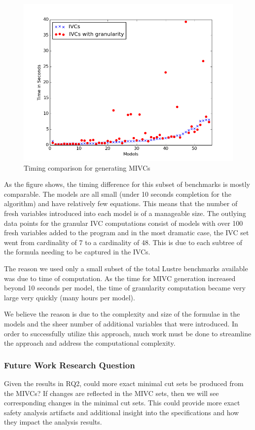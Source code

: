 \begin{figure}[h!]
\begin{center}
\includegraphics[width=.8\textwidth]{images/granularityIVC.png}
\caption{Timing comparison for generating MIVCs} 
\label{fig:granIVC}
\end{center}
\end{figure}

As the figure shows, the timing difference for this subset of benchmarks is mostly comparable. The models are all small (under 10 seconds completion for the \aivcalg algorithm) and have relatively few equations. This means that the number of fresh variables introduced into each model is of a manageable size. The outlying data points for the granular IVC computations consist of models with over 100 fresh variables added to the program and in the most dramatic case, the IVC set went from cardinality of 7 to a cardinality of 48. This is due to each subtree of the formula needing to be captured in the IVCs. 

The reason we used only a small subset of the total Lustre benchmarks available was due to time of computation. As the time for MIVC generation increased beyond 10 seconds per model, the time of granularity computation became very large very quickly (many hours per model). 

We believe the reason is due to the complexity and size of the formulae in the models and the sheer number of additional variables that were introduced. In order to successfully utilize this approach, much work must be done to streamline the approach and address the computational complexity. 

\subsubsection{Future Work Research Question}
Given the results in RQ2, could more exact minimal cut sets be produced from the MIVCs? If changes are reflected in the MIVC sets, then we will see corresponding changes in the minimal cut sets. This could provide more exact safety analysis artifacts and additional insight into the specifications and how they impact the analysis results.

